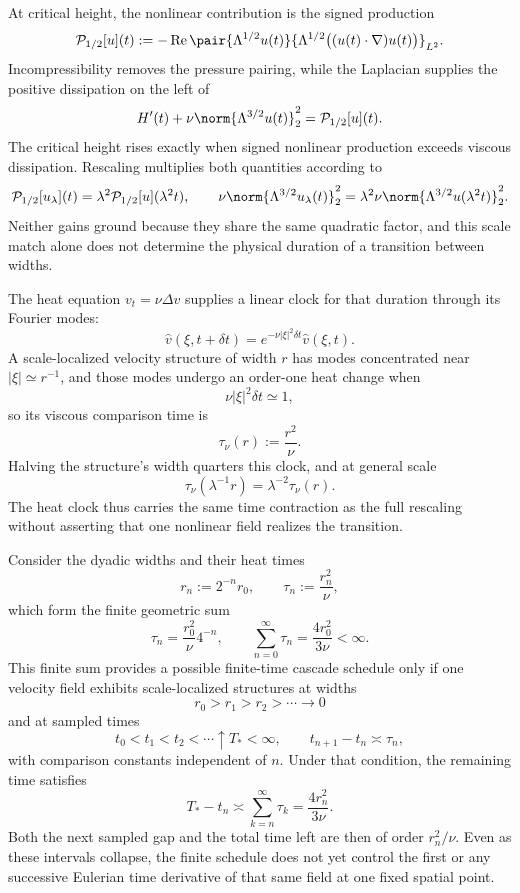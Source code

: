 
At critical height, the nonlinear contribution is the signed production
\[
  \mathcal P_{1/2}[u](t)
  :=
  -\operatorname{Re}
  \pair
    {\Lambda^{1/2}u(t)}
    {\Lambda^{1/2}\bigl((u(t)\cdot\nabla)u(t)\bigr)}_{L^2}.
\]
Incompressibility removes the pressure pairing, while the Laplacian supplies the positive dissipation on the left of
\[
  H'(t)
  +
  \nu\norm{\Lambda^{3/2}u(t)}_2^2
  =
  \mathcal P_{1/2}[u](t).
\]
The critical height rises exactly when signed nonlinear production exceeds viscous dissipation.
Rescaling multiplies both quantities according to
\[
  \mathcal P_{1/2}[u_\lambda](t)
  =
  \lambda^2\mathcal P_{1/2}[u](\lambda^2t),
  \qquad
  \nu\norm{\Lambda^{3/2}u_\lambda(t)}_2^2
  =
  \lambda^2\nu\norm{\Lambda^{3/2}u(\lambda^2t)}_2^2.
\]
Neither gains ground because they share the same quadratic factor, and this scale match alone does not determine the physical duration of a transition between widths.


The heat equation $v_t=\nu\Delta v$ supplies a linear clock for that duration through its Fourier modes:
\[
  \widehat v(\xi,t+\delta t)
  =
  e^{-\nu|\xi|^2\delta t}\widehat v(\xi,t).
\]
A scale-localized velocity structure of width $r$ has modes concentrated near $|\xi|\simeq r^{-1}$, and those modes undergo an order-one heat change when
\[
  \nu|\xi|^2\delta t\simeq1,
\]
so its viscous comparison time is
\[
  \tau_\nu(r)
  :=
  \frac{r^2}{\nu}.
\]
Halving the structure's width quarters this clock, and at general scale
\[
  \tau_\nu(\lambda^{-1}r)
  =
  \lambda^{-2}\tau_\nu(r).
\]
The heat clock thus carries the same time contraction as the full \NavierStokes{} rescaling without asserting that one nonlinear field realizes the transition.


Consider the dyadic widths and their heat times
\[
  r_n:=2^{-n}r_0,
  \qquad
  \tau_n:=\frac{r_n^2}{\nu},
\]
which form the finite geometric sum
\[
  \tau_n
  =
  \frac{r_0^2}{\nu}4^{-n},
  \qquad
  \sum_{n=0}^{\infty}\tau_n
  =
  \frac{4r_0^2}{3\nu}
  <
  \infty.
\]
This finite sum provides a possible finite-time cascade schedule only if one \NavierStokes{} velocity field exhibits scale-localized structures at widths
\[
  r_0>r_1>r_2>\cdots\longrightarrow0
\]
and at sampled times
\[
  t_0<t_1<t_2<\cdots\uparrow T_*<\infty,
  \qquad
  t_{n+1}-t_n\asymp\tau_n,
\]
with comparison constants independent of $n$.
Under that condition, the remaining time satisfies
\[
  T_*-t_n
  \asymp
  \sum_{k=n}^{\infty}\tau_k
  =
  \frac{4r_n^2}{3\nu}.
\]
Both the next sampled gap and the total time left are then of order $r_n^2/\nu$.
Even as these intervals collapse, the finite schedule does not yet control the first or any successive Eulerian time derivative of that same field at one fixed spatial point.
